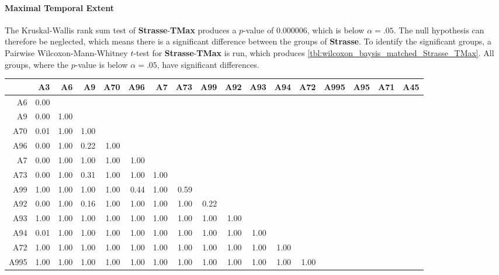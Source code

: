\paragraph{Maximal Temporal Extent}
The Kruskal-Wallis rank sum test of \textbf{Strasse}-\textbf{TMax} produces a $p$-value of 0.000006, which is below $\alpha=.05$. The null hypothesis can therefore be neglected, which means there is a significant difference between the groups of \textbf{Strasse}. To identify the significant groups, a Pairwise Wilcoxon-Mann-Whitney $t$-test for \textbf{Strasse}-\textbf{TMax} is run, which produces \autoref{tbl:wilcoxon_baysis_matched_Strasse_TMax}. All groups, where the $p$-value is below $\alpha=.05$, have significant differences. 
\begin{table}[ht]
	\tiny
	\setlength{\tabcolsep}{4pt}
	\centering
	\begin{tabular}{rrrrrrrrrrrrrrrrr}
		\toprule
				& A3 & A6 & A9 & A70 & A96 & A7 & A73 & A99 & A92 & A93 & A94 & A72 & A995 & A95 & A71 & A45 \\ 
		\midrule
		A6 		& 0.00 &  &  &  &  &  &  &  &  &  &  &  &  &  &  &  \\ 
		A9 		& 0.00 & 1.00 &  &  &  &  &  &  &  &  &  &  &  &  &  &  \\ 
		A70 	& 0.01 & 1.00 & 1.00 &  &  &  &  &  &  &  &  &  &  &  &  &  \\ 
		A96 	& 0.00 & 1.00 & 0.22 & 1.00 &  &  &  &  &  &  &  &  &  &  &  &  \\ 
		A7 		& 0.00 & 1.00 & 1.00 & 1.00 & 1.00 &  &  &  &  &  &  &  &  &  &  &  \\ 
		A73 	& 0.00 & 1.00 & 0.31 & 1.00 & 1.00 & 1.00 &  &  &  &  &  &  &  &  &  &  \\ 
		A99 	& 1.00 & 1.00 & 1.00 & 1.00 & 0.44 & 1.00 & 0.59 &  &  &  &  &  &  &  &  &  \\ 
		A92 	& 0.00 & 1.00 & 0.16 & 1.00 & 1.00 & 1.00 & 1.00 & 0.22 &  &  &  &  &  &  &  &  \\ 
		A93 	& 1.00 & 1.00 & 1.00 & 1.00 & 1.00 & 1.00 & 1.00 & 1.00 & 1.00 &  &  &  &  &  &  &  \\ 
		A94 	& 0.01 & 1.00 & 1.00 & 1.00 & 1.00 & 1.00 & 1.00 & 1.00 & 1.00 & 1.00 &  &  &  &  &  &  \\ 
		A72 	& 1.00 & 1.00 & 1.00 & 1.00 & 1.00 & 1.00 & 1.00 & 1.00 & 1.00 & 1.00 & 1.00 &  &  &  &  &  \\ 
		A995 	& 1.00 & 1.00 & 1.00 & 1.00 & 1.00 & 1.00 & 1.00 & 1.00 & 1.00 & 1.00 & 1.00 & 1.00 &  &  &  &  \\ 

\end{tabular}
\end{table}
